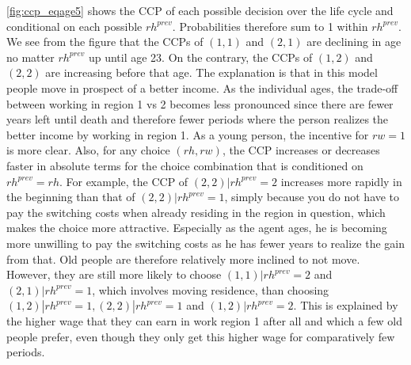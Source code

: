 \autoref{fig:ccp_eqage5} shows the CCP of each possible decision over the life cycle and conditional on each possible $rh^{prev}$. Probabilities therefore sum to 1 within $rh^{prev}$. We see from the figure that the CCPs of $(1,1)$ and $(2,1)$ are declining in age no matter $rh^{prev}$ up until age 23. On the contrary, the CCPs of $(1,2)$ and $(2,2)$ are increasing before that age. The explanation is that in this model people move in prospect of a better income. As the individual ages, the trade-off between working in region 1 vs 2 becomes less pronounced since there are fewer years left until death and therefore fewer periods where the person realizes the better income by working in region 1. As a young person, the incentive for $rw=1$ is more clear. Also, for any choice $(rh,rw)$, the CCP increases or decreases faster in absolute terms for the choice combination that is conditioned on $rh^{prev}=rh$. For example, the CCP of $(2,2)|rh^{prev}=2$ increases more rapidly in the beginning than that of $(2,2)|rh^{prev}=1$, simply because you do not have to pay the switching costs when already residing in the region in question, which makes the choice more attractive. Especially as the agent ages, he is becoming more unwilling to pay the switching costs as he has fewer years to realize the gain from that. Old people are therefore relatively more inclined to not move. However, they are still more likely to choose $(1,1)|rh^{prev}=2$ and $(2,1)|rh^{prev}=1$, which involves moving residence, than choosing $(1,2)|rh^{prev}=1, (2,2)|rh^{prev}=1$ and $(1,2)|rh^{prev}=2$. This is explained by the higher wage that they can earn in work region 1 after all and which a few old people prefer, even though they only get this higher wage for comparatively few periods. 
